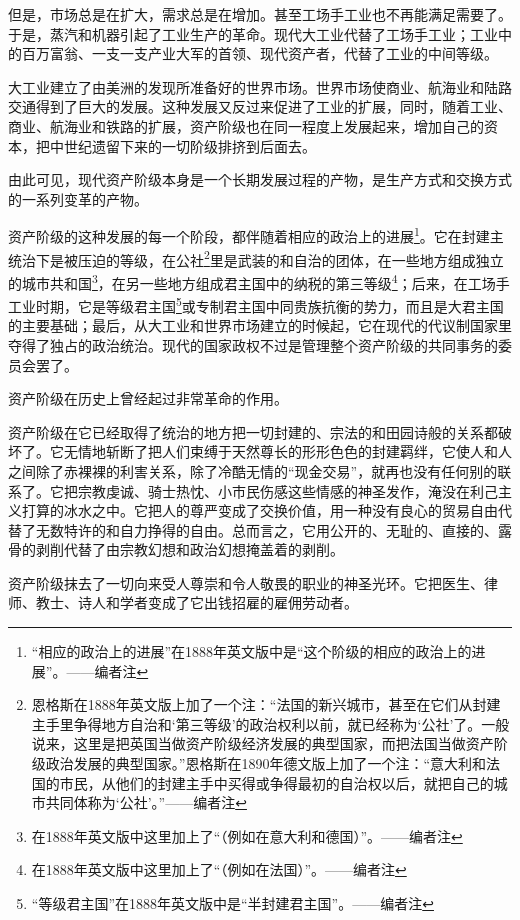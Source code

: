 \documentclass[UTF8,zihao=-4,a4paper]{ctexart}
\begin{document}
但是，市场总是在扩大，需求总是在增加。甚至工场手工业也不再能满足需要了。于是，蒸汽和机器引起了工业生产的革命。现代大工业代替了工场手工业；工业中的百万富翁、一支一支产业大军的首领、现代资产者，代替了工业的中间等级。\par
大工业建立了由美洲的发现所准备好的世界市场。世界市场使商业、航海业和陆路交通得到了巨大的发展。这种发展又反过来促进了工业的扩展，同时，随着工业、商业、航海业和铁路的扩展，资产阶级也在同一程度上发展起来，增加自己的资本，把中世纪遗留下来的一切阶级排挤到后面去。\par
由此可见，现代资产阶级本身是一个长期发展过程的产物，是生产方式和交换方式的一系列变革的产物。\par
资产阶级的这种发展的每一个阶段，都伴随着相应的政治上的进展\footnote{“相应的政治上的进展”在1888年英文版中是“这个阶级的相应的政治上的进展”。——编者注}。它在封建主统治下是被压迫的等级，在公社\footnote{恩格斯在1888年英文版上加了一个注：“法国的新兴城市，甚至在它们从封建主手里争得地方自治和‘第三等级’的政治权利以前，就已经称为‘公社’了。一般说来，这里是把英国当做资产阶级经济发展的典型国家，而把法国当做资产阶级政治发展的典型国家。”恩格斯在1890年德文版上加了一个注：“意大利和法国的市民，从他们的封建主手中买得或争得最初的自治权以后，就把自己的城市共同体称为‘公社’。”——编者注}里是武装的和自治的团体，在一些地方组成独立的城市共和国\footnote{在1888年英文版中这里加上了“（例如在意大利和德国）”。——编者注}，在另一些地方组成君主国中的纳税的第三等级\footnote{在1888年英文版中这里加上了“（例如在法国）”。——编者注}；后来，在工场手工业时期，它是等级君主国\footnote{“等级君主国”在1888年英文版中是“半封建君主国”。——编者注}或专制君主国中同贵族抗衡的势力，而且是大君主国的主要基础；最后，从大工业和世界市场建立的时候起，它在现代的代议制国家里夺得了独占的政治统治。现代的国家政权不过是管理整个资产阶级的共同事务的委员会罢了。\par
资产阶级在历史上曾经起过非常革命的作用。\par
资产阶级在它已经取得了统治的地方把一切封建的、宗法的和田园诗般的关系都破坏了。它无情地斩断了把人们束缚于天然尊长的形形色色的封建羁绊，它使人和人之间除了赤裸裸的利害关系，除了冷酷无情的“现金交易”，就再也没有任何别的联系了。它把宗教虔诚、骑士热忱、小市民伤感这些情感的神圣发作，淹没在利己主义打算的冰水之中。它把人的尊严变成了交换价值，用一种没有良心的贸易自由代替了无数特许的和自力挣得的自由。总而言之，它用公开的、无耻的、直接的、露骨的剥削代替了由宗教幻想和政治幻想掩盖着的剥削。\par
资产阶级抹去了一切向来受人尊崇和令人敬畏的职业的神圣光环。它把医生、律师、教士、诗人和学者变成了它出钱招雇的雇佣劳动者。\par
\end{document}
